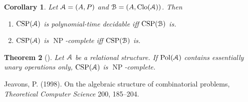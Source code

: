 \documentclass{amsart}
\theoremstyle{plain}
\newtheorem{theorem}{Theorem}[section]
\newtheorem{corollary}[theorem]{Corollary}
\theoremstyle{definition}
\theoremstyle{remark}
\DeclareMathOperator{\Clo}{Clo}
\DeclareMathOperator{\CSP}{CSP}
\DeclareMathOperator{\Pol}{Pol}
\DeclareMathOperator{\NP}{NP}
\begin{document}
\begin{corollary}
    Let $\EuScript{A}=(A,P)$ and $\EuScript{B}=(A, \Clo(\EuScript{A}))$. 
    Then 
    \begin{enumerate}
        \item $\CSP(\EuScript{A})$ is polynomial-time decidable iff $\CSP(\EuScript{B})$ is. 
        \item $\CSP(\EuScript{A})$ is $\NP$-complete iff $\CSP(\EuScript{B})$ is. 
    \end{enumerate}
\end{corollary}

\begin{theorem}[\cite{jeavons}]
    Let $\EuScript{A}$ be a relational structure. 
    If $\Pol(\EuScript{A})$ contains essentially unary operations only, $\CSP(\EuScript{A})$ is $\NP$-complete. 
\end{theorem}


\begin{thebibliography}{9}
    
       Jeavons, P. (1998). On the algebraic structure of combinatorial problems, \emph{Theoretical Computer Science} 200, 185–204.
 \end{thebibliography}
\end{document}
